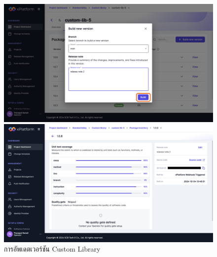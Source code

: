 \begin{figure}[H]
    \begin{center}
        \includegraphics[width=\linewidth]{resources/pages/custom-library/update-library/8.png}
    
        \vspace{1in}
    
        \includegraphics[width=\linewidth]{resources/pages/custom-library/update-library/9.png}
    \end{center}
    \caption[การอัพเดตเวอร์ชัน Custom Library]{การอัพเดตเวอร์ชัน Custom Library}
  \label{fig:update-library}
\end{figure}


\newpage
